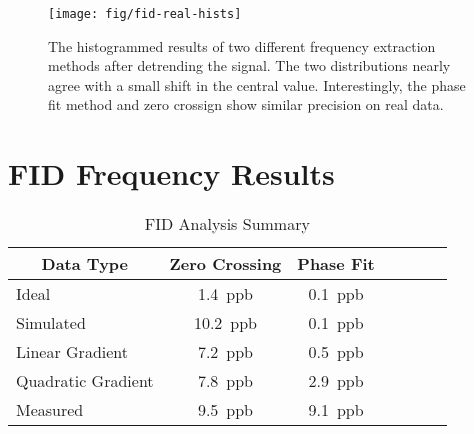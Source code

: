 \begin{figure}
\centering
\texttt{[image: fig/fid-real-hists]}
\caption{
    The histogrammed results of two different frequency extraction methods after detrending the signal.  The two distributions nearly agree with a small shift in the central value.  Interestingly, the phase fit method and zero crossign show similar precision on real data.
    \label{fig:fid-real-hists}
}
\end{figure}

\section{FID Frequency Results}

\begin{table}[h]
\label{tab:fid-analysis-summary}
\caption{FID Analysis Summary}
\centering
\begin{tabular}{l c c c c c c}
    \hline
    \multicolumn{1}{c}{Data Type} & Zero Crossing & Phase Fit \\
    \hline
    Ideal                & \SI{1.4}{ppb}  & \SI{0.1}{ppb} \\
    Simulated            & \SI{10.2}{ppb} & \SI{0.1}{ppb} \\
    Linear Gradient      & \SI{7.2}{ppb}  & \SI{0.5}{ppb} \\
    Quadratic Gradient   & \SI{7.8}{ppb}  & \SI{2.9}{ppb} \\
    Measured             & \SI{9.5}{ppb}  & \SI{9.1}{ppb} \\
    \hline
\end{tabular}
\end{table}

